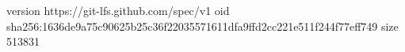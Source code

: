 version https://git-lfs.github.com/spec/v1
oid sha256:1636de9a75c90625b25c36f22035571611dfa9ffd2cc221e511f244f77eff749
size 513831
